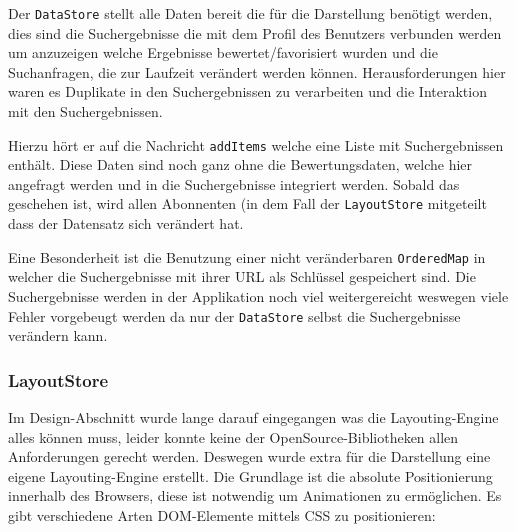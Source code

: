 \documentclass[12pt,twoside]{book}
\begin{document}
Der \texttt{DataStore} stellt alle Daten bereit die für die Darstellung benötigt werden, dies sind die Suchergebnisse die mit dem Profil des Benutzers verbunden werden um anzuzeigen welche Ergebnisse bewertet/favorisiert wurden und die Suchanfragen, die zur Laufzeit verändert werden können. Herausforderungen hier waren es Duplikate in den Suchergebnissen zu verarbeiten und die Interaktion mit den Suchergebnissen.

Hierzu hört er auf die Nachricht \texttt{addItems} welche eine Liste mit Suchergebnissen enthält. Diese Daten sind noch ganz ohne die Bewertungsdaten, welche hier angefragt werden und in die Suchergebnisse integriert werden. Sobald das geschehen ist, wird allen Abonnenten (in dem Fall der \texttt{LayoutStore} mitgeteilt dass der Datensatz sich verändert hat. 

Eine Besonderheit ist die Benutzung einer nicht veränderbaren \texttt{OrderedMap} in welcher die Suchergebnisse mit ihrer URL als Schlüssel gespeichert sind. Die Suchergebnisse werden in der Applikation noch viel weitergereicht weswegen viele Fehler vorgebeugt werden da nur der \texttt{DataStore} selbst die Suchergebnisse verändern kann.

\subsubsection{LayoutStore}

Im Design-Abschnitt wurde lange darauf eingegangen was die Layouting-Engine alles können muss, leider konnte keine der OpenSource-Bibliotheken allen Anforderungen gerecht werden. Deswegen wurde extra für die Darstellung eine eigene Layouting-Engine erstellt.
Die Grundlage ist die absolute Positionierung innerhalb des Browsers, diese ist notwendig um Animationen zu ermöglichen. Es gibt verschiedene Arten DOM-Elemente mittels CSS zu positionieren:
\end{document}
